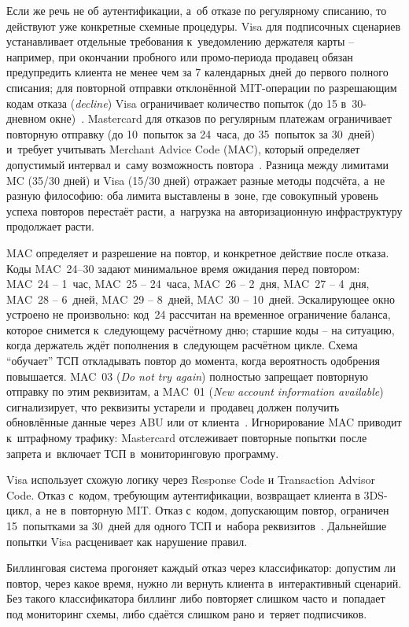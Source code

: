 Если же речь не об аутентификации, а~об отказе по регулярному списанию,
то действуют уже конкретные схемные процедуры. Visa для подписочных
сценариев устанавливает отдельные требования к~уведомлению держателя
карты -- например, при окончании пробного или промо-периода продавец
обязан предупредить клиента не менее чем за 7 календарных дней
до первого полного списания; для повторной отправки отклонённой
MIT-операции по разрешающим кодам отказа (\textit{decline}) Visa
ограничивает количество попыток (до 15 в~30-дневном
окне)~\cite{visa-core-rules}. Mastercard для отказов по
регулярным платежам ограничивает повторную отправку (до 10~попыток
за 24~часа, до 35~попыток за 30~дней) и~требует учитывать Merchant
Advice Code (MAC), который определяет допустимый интервал
и~саму возможность повтора~\cite{mc-tpr}. Разница между лимитами
MC (35/30 дней) и Visa (15/30 дней) отражает разные методы подсчёта,
а~не разную философию: оба лимита выставлены в~зоне, где
совокупный уровень успеха повторов перестаёт расти, а~нагрузка
на авторизационную инфраструктуру продолжает расти.

MAC определяет и разрешение на повтор, и конкретное действие после
отказа. Коды MAC~24--30 задают минимальное время ожидания перед
повтором: MAC~24 -- 1~час, MAC~25 -- 24~часа, MAC~26 -- 2~дня,
MAC~27 -- 4~дня, MAC~28 -- 6~дней, MAC~29 -- 8~дней, MAC~30 -- 10~дней.
Эскалирующее окно устроено не произвольно: код~24 рассчитан на
временное ограничение баланса, которое снимется к~следующему
расчётному дню; старшие коды -- на ситуацию, когда держатель ждёт
пополнения в~следующем расчётном цикле. Схема \enquote{обучает} ТСП
откладывать повтор до момента, когда вероятность одобрения
повышается. MAC~03
(\textit{Do not try again}) полностью запрещает повторную
отправку по этим реквизитам, а MAC~01
(\textit{New account information available}) сигнализирует, что
реквизиты устарели и~продавец должен получить обновлённые данные
через ABU или от клиента~\cite{mc-tpr}. Игнорирование MAC
приводит к~штрафному трафику: Mastercard отслеживает повторные
попытки после запрета и~включает ТСП в~мониторинговую
программу.

Visa использует схожую логику через Response Code и Transaction
Advisor Code. Отказ с~кодом, требующим аутентификации, возвращает
клиента в 3DS-цикл, а~не в~повторную MIT. Отказ с~кодом,
допускающим повтор, ограничен 15~попытками за 30~дней для
одного ТСП и~набора реквизитов~\cite{visa-core-rules}.
Дальнейшие попытки Visa расценивает как нарушение правил.

Биллинговая система прогоняет каждый отказ через классификатор:
допустим ли повтор, через какое время, нужно ли вернуть клиента
в~интерактивный сценарий. Без такого классификатора биллинг
либо повторяет слишком часто и~попадает под мониторинг схемы,
либо сдаётся слишком рано и~теряет подписчиков.

